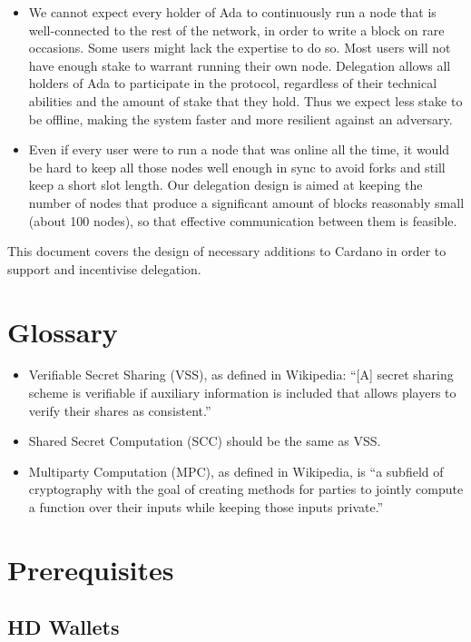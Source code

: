 \documentclass[11pt,a4paper]{article}
\begin{document}
\begin{itemize}
\item
  We cannot expect every holder of Ada to continuously run a node that
  is well-connected to the rest of the network, in order to write a
  block on rare occasions. Some users might lack the expertise to do so.
  Most users will not have enough stake to warrant running their own
  node. Delegation allows all holders of Ada to participate in the
  protocol, regardless of their technical abilities and the amount of
  stake that they hold. Thus we expect less stake to be offline, making
  the system faster and more resilient against an adversary.
\item
  Even if every user were to run a node that was online all the time, it
  would be hard to keep all those nodes well enough in sync to avoid
  forks and still keep a short slot length. Our delegation design is
  aimed at keeping the number of nodes that produce a significant amount
  of blocks reasonably small (about 100 nodes), so that effective
  communication between them is feasible.
\end{itemize}

This document covers the design of necessary additions to Cardano in
order to support and incentivise delegation.

\section{Glossary}\label{glossary}

\begin{itemize}
\item Verifiable Secret Sharing (VSS), as defined in Wikipedia: ``[A] secret
  sharing scheme is verifiable if auxiliary information is included that
  allows players to verify their shares as consistent.''
\item Shared Secret Computation (SCC) should be the same as VSS.
\item Multiparty Computation (MPC), as defined in Wikipedia, is ``a subfield
  of cryptography with the goal of creating methods for parties to jointly
  compute a function over their inputs while keeping those inputs private.''
\end{itemize}

\section{Prerequisites}\label{prerequisites}

\subsection{HD Wallets}\label{hd-wallets}
\end{document}

